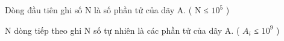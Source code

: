 Dòng đầu tiên ghi số N là số phần tử của dãy A. ( N ≤ $10^{5}$   )  

   N dòng tiếp theo ghi N số tự nhiên là các phần tử của dãy A. (  $A_{i}$   ≤ $10^{9}$   )